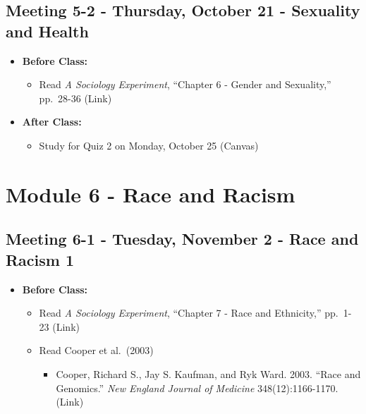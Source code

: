 \documentclass[
]{book}
\providecommand{\tightlist}{%
  \setlength{\itemsep}{0pt}\setlength{\parskip}{0pt}}
\begin{document}
\hypertarget{meeting-5-2---thursday-october-21---sexuality-and-health}{%
\subsection*{Meeting 5-2 - Thursday, October 21 - Sexuality and Health}\label{meeting-5-2---thursday-october-21---sexuality-and-health}}

\begin{itemize}
\tightlist
\item
  \textbf{Before Class:}

  \begin{itemize}
  \tightlist
  \item
    Read \emph{A Sociology Experiment}, ``Chapter 6 - Gender and Sexuality,'' pp.~28-36 (Link)
  \end{itemize}
\item
  \textbf{After Class:}

  \begin{itemize}
  \tightlist
  \item
    Study for Quiz 2 on Monday, October 25 (Canvas)
  \end{itemize}
\end{itemize}

\newpage

\hypertarget{module-6---race-and-racism}{%
\section{Module 6 - Race and Racism}\label{module-6---race-and-racism}}

\hypertarget{meeting-6-1---tuesday-november-2---race-and-racism-1}{%
\subsection*{Meeting 6-1 - Tuesday, November 2 - Race and Racism 1}\label{meeting-6-1---tuesday-november-2---race-and-racism-1}}

\begin{itemize}
\tightlist
\item
  \textbf{Before Class:}

  \begin{itemize}
  \tightlist
  \item
    Read \emph{A Sociology Experiment}, ``Chapter 7 - Race and Ethnicity,'' pp.~1-23 (Link)
  \item
    Read Cooper et al.~(2003)

    \begin{itemize}
    \tightlist
    \item
      Cooper, Richard S., Jay S. Kaufman, and Ryk Ward. 2003. ``Race and Genomics.'' \emph{New England Journal of Medicine} 348(12):1166-1170. (Link)
    \end{itemize}
  \end{itemize}
\end{itemize}
\end{document}
